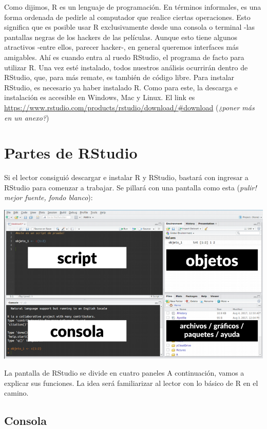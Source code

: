 \documentclass[]{book}
\begin{document}
Como dijimos, R es un lenguaje de programación. En términos informales,
es una forma ordenada de pedirle al computador que realice ciertas
operaciones. Esto significa que es posible usar R exclusivamente desde
una consola o terminal -las pantallas negras de los hackers de las
películas. Aunque esto tiene algunos atractivos -entre ellos, parecer
hacker-, en general queremos interfaces más amigables. Ahí es cuando
entra al ruedo RStudio, el programa de facto para utilizar R. Una vez
esté instalado, todos nuestros análisis ocurrirán dentro de RStudio,
que, para más remate, es también de código libre. Para instalar RStudio,
es necesario ya haber instalado R. Como para este, la descarga e
instalación es accesible en Windows, Mac y Linux. El link es
\url{https://www.rstudio.com/products/rstudio/download/\#download}
(\emph{¿poner más en un anexo?})

\section{Partes de RStudio}\label{partes-de-rstudio}

Si el lector consiguió descargar e instalar R y RStudio, bastará con
ingresar a RStudio para comenzar a trabajar. Se pillará con una pantalla
como esta (\emph{pulir! mejor fuente, fondo blanco}):

\includegraphics[width=1.2\linewidth]{00-images/fig_3_1}

La pantalla de RStudio se divide en cuatro paneles A continuación, vamos
a explicar sus funciones. La idea será familiarizar al lector con lo
básico de R en el camino.

\subsection{Consola}\label{consola}
\end{document}
